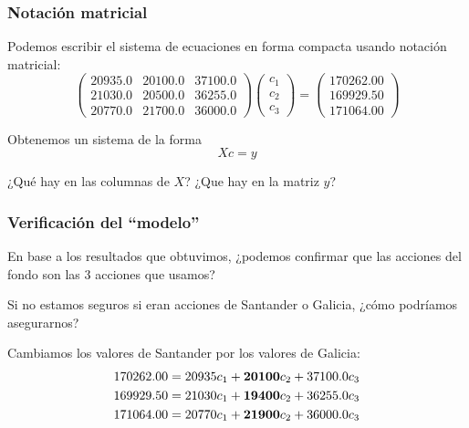 \documentclass[aspectratio=169,12pt]{beamer}
\begin{document}
\begin{frame}
\frametitle{Notación matricial}

Podemos escribir el sistema de ecuaciones
en forma compacta usando notación matricial:
$$
\begin{pmatrix}
20935.0	& 20100.0 & 37100.0 \\
21030.0	& 20500.0 & 36255.0 \\
20770.0	& 21700.0 & 36000.0
\end{pmatrix}
\begin{pmatrix}
c_1 \\
c_2 \\
c_3
\end{pmatrix} = 
\begin{pmatrix}
170262.00 \\
169929.50 \\
171064.00
\end{pmatrix}
$$

Obtenemos un sistema de la forma
$$
X c = y
$$

¿Qué hay en las columnas de $X$? ¿Que hay en la matriz $y$?



\end{frame}


\begin{frame}
\frametitle{Verificación del ``modelo''}

En base a los resultados que obtuvimos, ¿podemos confirmar que las acciones del fondo son las 3 acciones que usamos?

Si no estamos seguros si eran acciones de Santander o Galicia, ¿cómo podríamos asegurarnos?

Cambiamos los valores de Santander por los valores de Galicia:
\begin{align*}
170262.00	&= 20935	c_1 + {\bf 20100} c_2 + 37100.0 c_3 \\
169929.50	&= 21030	c_1 + {\bf 19400} c_2 + 36255.0 c_3 \\
171064.00	&= 20770	c_1 + {\bf 21900} c_2 + 36000.0 c_3
\end{align*}


\end{frame}


\end{document}
